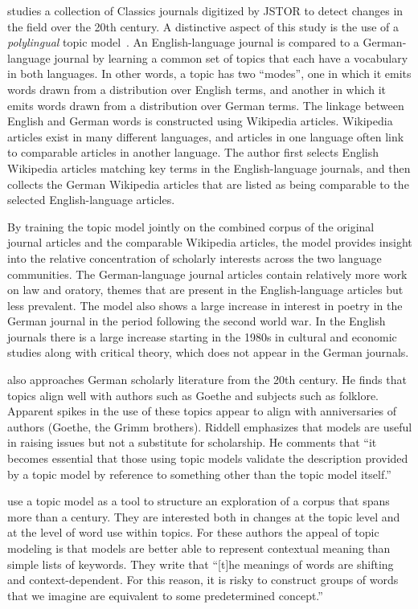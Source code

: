 \citet{mimno-12b} studies a collection of Classics journals digitized by JSTOR to detect changes in the field over the 20th century.
A distinctive aspect of this study is the use of a {\em polylingual} topic model~\citep{mimno-09}.
An English-language journal is compared to a German-language journal by learning a common set of topics that each have a vocabulary in both languages.
In other words, a topic has two ``modes'', one in which it emits words drawn from a distribution over English terms, and another in which it emits words drawn from a distribution over German terms.
The linkage between English and German words is constructed using Wikipedia articles.
Wikipedia articles exist in many different languages, and articles in one language often link to comparable articles in another language.
The author first selects English Wikipedia articles matching key terms in the English-language journals, and then collects the German Wikipedia articles that are listed as being comparable to the selected English-language articles.

By training the topic model jointly on the combined corpus of the original journal articles and the comparable Wikipedia articles, the model provides insight into the relative concentration of scholarly interests across the two language communities.
The German-language journal articles contain relatively more work on law and oratory, themes that are present in the English-language articles but less prevalent.
The model also shows a large increase in  interest in poetry in the German journal in the period following the second world war.
In the English journals there is a large increase starting in the 1980s in cultural and economic studies along with critical theory, which does not appear in the German journals.

\citet{riddell-12} also approaches German scholarly literature from the 20th century. He finds that topics align well with authors such as Goethe and subjects such as folklore. Apparent spikes in the use of these topics appear to align with anniversaries of authors (Goethe, the Grimm brothers).
Riddell emphasizes that models are useful in raising issues but not a substitute for scholarship.
He comments that ``it becomes essential that those using topic models validate the description provided by a topic model by reference to something other than the topic model itself.''

\citet{Goldstone-14} use a topic model as a tool to structure an exploration of a corpus that spans more than a century.
They are interested both in changes at the topic level and at the level of word use within topics.
For these authors the appeal of topic modeling is that models are better able to represent contextual meaning than simple lists of keywords. They write that ``[t]he meanings
of words are shifting and context-dependent. For this reason, it is risky to
construct groups of words that we imagine are equivalent to some predetermined
concept.''

